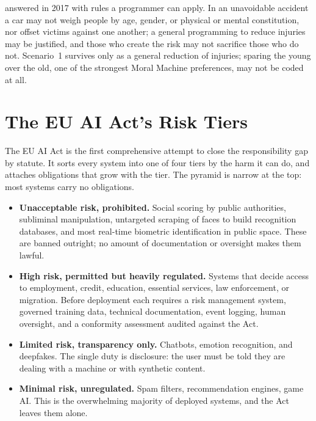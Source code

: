  answered in 2017 with rules a
programmer can apply. In an unavoidable accident a car may not weigh people
by age, gender, or physical or mental constitution, nor offset victims
against one another; a general programming to reduce injuries may be
justified, and those who create the risk may not sacrifice those who do
not\cite{ethikkommission2017fahren}. Scenario~1 survives only as a general
reduction of injuries; sparing the young over the old, one of the strongest
Moral Machine preferences, may not be coded at all.

\section*{The EU AI Act's Risk Tiers}


\noindent The EU AI Act\cite{euaiact2024} is the first comprehensive
attempt to close the responsibility gap by statute. It sorts every system
into one of four tiers by the harm it can do, and attaches obligations that
grow with the tier. The pyramid is narrow at the top: most systems carry no
obligations.

\begin{itemize}
    \item \textbf{Unacceptable risk, prohibited.} Social scoring by public
    authorities, subliminal manipulation, untargeted scraping of faces to
    build recognition databases, and most real-time biometric
    identification in public space. These are banned outright; no amount of
    documentation or oversight makes them lawful.
    \item \textbf{High risk, permitted but heavily regulated.} Systems that
    decide access to employment, credit, education, essential services, law
    enforcement, or migration. Before deployment each requires a risk
    management system, governed training data, technical documentation,
    event logging, human oversight, and a conformity assessment audited
    against the Act.
    \item \textbf{Limited risk, transparency only.} Chatbots, emotion
    recognition, and deepfakes. The single duty is disclosure: the user
    must be told they are dealing with a machine or with synthetic content.
    \item \textbf{Minimal risk, unregulated.} Spam filters, recommendation
    engines, game AI. This is the overwhelming majority of deployed
    systems, and the Act leaves them alone.
\end{itemize}

